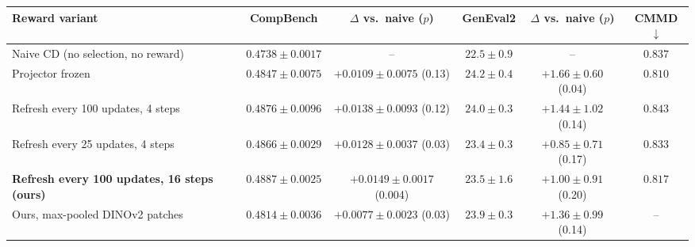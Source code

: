 \begin{tabular}{l c c c c c}
\toprule
Reward variant & CompBench & $\Delta$ vs.\ naive ($p$) & GenEval2 & $\Delta$ vs.\ naive ($p$) & CMMD$\downarrow$ \\
\midrule
Naive CD (no selection, no reward) & $0.4738\pm0.0017$ & -- & $22.5\pm0.9$ & -- & $0.837$ \\
Projector frozen & $0.4847\pm0.0075$ & $+0.0109\pm0.0075$ (0.13) & $24.2\pm0.4$ & $+1.66\pm0.60$ (0.04) & $0.810$ \\
Refresh every 100 updates, 4 steps & $0.4876\pm0.0096$ & $+0.0138\pm0.0093$ (0.12) & $24.0\pm0.3$ & $+1.44\pm1.02$ (0.14) & $0.843$ \\
Refresh every 25 updates, 4 steps & $0.4866\pm0.0029$ & $+0.0128\pm0.0037$ (0.03) & $23.4\pm0.3$ & $+0.85\pm0.71$ (0.17) & $0.833$ \\
\textbf{Refresh every 100 updates, 16 steps (ours)} & $0.4887\pm0.0025$ & $+0.0149\pm0.0017$ (0.004) & $23.5\pm1.6$ & $+1.00\pm0.91$ (0.20) & $0.817$ \\
Ours, max-pooled DINOv2 patches & $0.4814\pm0.0036$ & $+0.0077\pm0.0023$ (0.03) & $23.9\pm0.3$ & $+1.36\pm0.99$ (0.14) & -- \\
\bottomrule
\end{tabular}